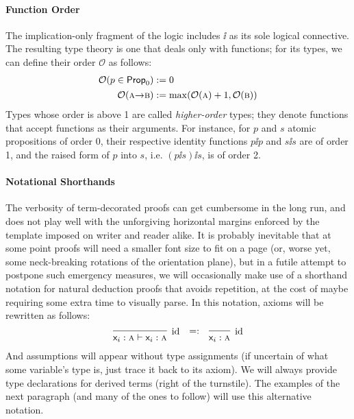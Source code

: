 \paragraph{Function Order} The implication-only fragment of the logic includes $\ii$ as its sole logical connective.
The resulting type theory is one that deals only with functions; for its types, we can define their order $\mathcal{O}$ as follows:
\begin{equation}\label{equation:type_order}
	\begin{aligned}
	\mathcal{O}(p \in \propcon{}) & := 0 \\
	\mathcal{O}(\prop{a} \ii \prop{b}) & := \mathrm{max}(\mathcal{O}(\prop{a}) + 1, \mathcal{O}(\prop{b}))
	\end{aligned}
\end{equation}
Types whose order is above 1 are called \textit{higher-order} types; they denote functions that accept functions as their arguments.
For instance, for $p$ and $s$ atomic propositions of order 0, their respective identity functions $p\ii p$ and $s\ii s$ are of order 1, and the raised form of $p$ into $s$, i.e. $(p\ii s)\ii s$, is of order 2.

\paragraph{Notational Shorthands}
The verbosity of term-decorated proofs can get cumbersome in the long run, and does not play well with the unforgiving horizontal margins enforced by the template imposed on writer and reader alike.
It is probably inevitable that at some point proofs will need a smaller font size to fit on a page (or, worse yet, some neck-breaking rotations of the orientation plane), but in a futile attempt to postpone such emergency measures, we will occasionally make use of a shorthand notation for natural deduction proofs that avoids repetition, at the cost of maybe requiring some extra time to visually parse.
In this notation, axioms will be rewritten as follows:
\[
\infer[\Ax]{\term{\vari }: \prop{a} \vdash \term{\vari }: \prop{a}}{} \quad \raisebox{7pt}{$=:$} \quad \infer[\Ax]{\term{\vari }:\prop{a}}{}
\]
And assumptions will appear without type assignments (if uncertain of what some variable's type is, just trace it back to its axiom). 
We will always provide type declarations for derived terms (right of the turnstile).
The examples of the next paragraph (and many of the ones to follow) will use this alternative notation.

